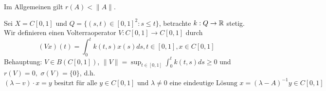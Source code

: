 Im Allgemeinen gilt $r(A) < \| A \|$.


\begin{beispiel} \label{bsp:13.10}
	Sei $X = C[0, 1]$ und  $Q = \{ (s, t) \in [0, 1]^{2}: s \leq t \}$, betrachte $k: Q \rightarrow \mathbb{R}$ stetig.  \\
	Wir definieren einen Volterraoperator $V: C[0, 1] \rightarrow C[0, 1]$ durch 
		\[ (V x)(t) = \int_{0}^{t} k(t, s) x(s) ds, t \in [0, 1], x \in C[0, 1] \]
	Behauptung: $V \in B(C[0, 1])$, $\| V \| = \sup_{t \in [0, 1]} \int_{0}^{t} k(t, s) ds \geq 0$ und $r(V) = 0,$ $\sigma(V) = \{ 0 \}$, d.h. \\
	\[ (\lambda - v) \cdot x = y \text{ besitzt für alle } y \in C[0, 1]  \text{ und } \lambda \neq 0 \text{ eine eindeutige Lösung } x = (\lambda - A)^{-1} y \in C[0, 1] \]
\end{beispiel}


